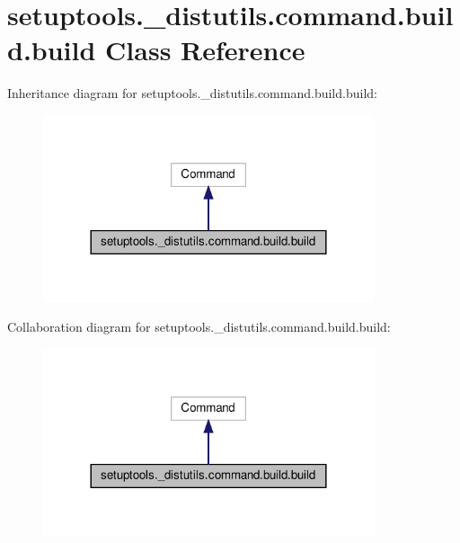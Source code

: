 \hypertarget{classsetuptools_1_1__distutils_1_1command_1_1build_1_1build}{}\section{setuptools.\+\_\+distutils.\+command.\+build.\+build Class Reference}
\label{classsetuptools_1_1__distutils_1_1command_1_1build_1_1build}


Inheritance diagram for setuptools.\+\_\+distutils.\+command.\+build.\+build\+:
\nopagebreak
\begin{figure}[H]
\begin{center}
\leavevmode
\includegraphics[width=276pt]{classsetuptools_1_1__distutils_1_1command_1_1build_1_1build__inherit__graph}
\end{center}
\end{figure}


Collaboration diagram for setuptools.\+\_\+distutils.\+command.\+build.\+build\+:
\nopagebreak
\begin{figure}[H]
\begin{center}
\leavevmode
\includegraphics[width=276pt]{classsetuptools_1_1__distutils_1_1command_1_1build_1_1build__coll__graph}
\end{center}
\end{figure}
